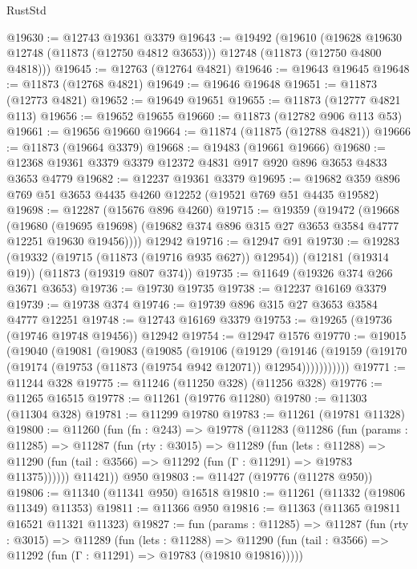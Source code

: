 \begin{lexlean}{RustStd}
\begin{coremodule}
@19630 := @12743 @19361 @3379
@19643 := @19492
    (@19610
      (@19628 @19630 @12748 (@11873 (@12750 @4812 @3653)))
      @12748
      (@11873 (@12750 @4800 @4818)))
@19645 := @12763 (@12764 @4821)
@19646 := @19643 @19645
@19648 := @11873 (@12768 @4821)
@19649 := @19646 @19648
@19651 := @11873 (@12773 @4821)
@19652 := @19649 @19651
@19655 := @11873 (@12777 @4821 @113)
@19656 := @19652 @19655
@19660 := @11873 (@12782 @906 @113 @53)
@19661 := @19656 @19660
@19664 := @11874 (@11875 (@12788 @4821))
@19666 := @11873 (@19664 @3379)
@19668 := @19483 (@19661 @19666)
@19680 := @12368 @19361 @3379 @3379 @12372 @4831 @917 @920 @896 @3653 @4833 @3653 @4779
@19682 := @12237 @19361 @3379
@19695 := @19682 @359 @896 @769 @51 @3653 @4435 @4260 @12252 (@19521 @769 @51 @4435 @19582)
@19698 := @12287 (@15676 @896 @4260)
@19715 := @19359
    (@19472
      (@19668
        (@19680
          (@19695 @19698)
          (@19682 @374 @896 @315 @27 @3653 @3584 @4777 @12251 @19630 @19456))))
    @12942
@19716 := @12947 @91
@19730 := @19283
    (@19332 (@19715 (@11873 (@19716 @935 @627)) @12954))
    (@12181 (@19314 @19))
    (@11873 (@19319 @807 @374))
@19735 := @11649 (@19326 @374 @266 @3671 @3653)
@19736 := @19730 @19735
@19738 := @12237 @16169 @3379
@19739 := @19738 @374
@19746 := @19739 @896 @315 @27 @3653 @3584 @4777 @12251
@19748 := @12743 @16169 @3379
@19753 := @19265 (@19736 (@19746 @19748 @19456)) @12942
@19754 := @12947 @1576
@19770 := @19015
    (@19040
      (@19081
        (@19083
          (@19085
            (@19106
              (@19129
                (@19146
                  (@19159 (@19170 (@19174 (@19753 (@11873 (@19754 @942 @12071)) @12954)))))))))))
@19771 := @11244 @328
@19775 := @11246 (@11250 @328) (@11256 @328)
@19776 := @11265 @16515
@19778 := @11261 (@19776 @11280)
@19780 := @11303 (@11304 @328)
@19781 := @11299 @19780
@19783 := @11261 (@19781 @11328)
@19800 := @11260
    (fun (fn : @243) =>
    @19778
      (@11283
        (@11286
          (fun (params : @11285) =>
          @11287
            (fun (rty : @3015) =>
            @11289
              (fun (lets : @11288) =>
              @11290 (fun (tail : @3566) => @11292 (fun (Γ : @11291) => @19783 @11375))))))
        @11421))
    @950
@19803 := @11427 (@19776 (@11278 @950))
@19806 := @11340 (@11341 @950) @16518
@19810 := @11261 (@11332 (@19806 @11349) @11353)
@19811 := @11366 @950
@19816 := @11363 (@11365 @19811 @16521 @11321 @11323)
@19827 := fun (params : @11285) =>
  @11287
    (fun (rty : @3015) =>
    @11289
      (fun (lets : @11288) =>
      @11290 (fun (tail : @3566) => @11292 (fun (Γ : @11291) => @19783 (@19810 @19816)))))

\end{coremodule}
\end{lexlean}
